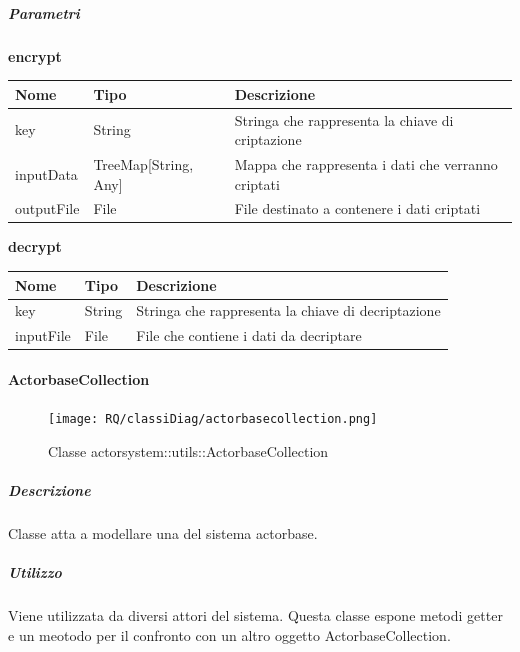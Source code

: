 \documentclass{scalatekids-article}
\begin{document}
\subparagraph{Parametri}
\begin{center}
  \textbf{encrypt}\\
\end{center}
\begin{tabular}{| l | l | l |}
  \hline
  Nome & Tipo & Descrizione\\
  \hline
  key & String & Stringa che rappresenta la chiave di criptazione \\
  \hline
  inputData & TreeMap[String, Any] & Mappa che rappresenta i dati che verranno criptati \\
  \hline
  outputFile & File & File destinato a contenere i dati criptati \\
  \hline
\end{tabular}

\begin{center}
  \textbf{decrypt}\\
\end{center}
\begin{tabular}{| l | l | l |}
  \hline
  Nome & Tipo & Descrizione\\
  \hline
  key & String & Stringa che rappresenta la chiave di decriptazione \\
  \hline
  inputFile & File & File che contiene i dati da decriptare \\
  \hline
\end{tabular}


\paragraph{ActorbaseCollection}
\label{sec:actorbase::actorsystem::utils::ActorbaseCollection}

\begin{figure}[H]
  \begin{center}
    \texttt{[image: RQ/classiDiag/actorbasecollection.png]}
    \caption{Classe actorsystem::utils::ActorbaseCollection}
  \end{center}
\end{figure}

\subparagraph{Descrizione}
Classe atta a modellare una  del sistema actorbase.

\subparagraph{Utilizzo}
Viene utilizzata da diversi attori del sistema. Questa classe espone metodi
getter e un meotodo per il confronto con un altro oggetto ActorbaseCollection.
\end{document}
